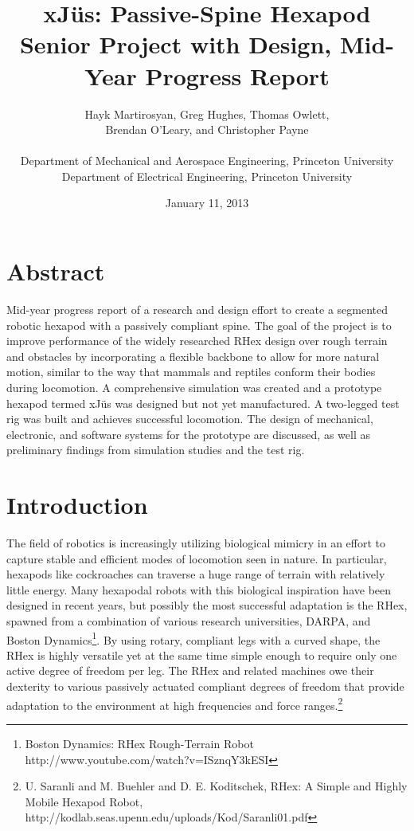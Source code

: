 \documentclass[11pt]{article}
\title{xJ\"{u}s: Passive-Spine Hexapod \\
Senior Project with Design, Mid-Year Progress Report}
\author{Hayk Martirosyan, Greg Hughes, Thomas Owlett,\\ Brendan O'Leary, and Christopher Payne\\\\
Department of Mechanical and Aerospace Engineering, Princeton University\\
Department of Electrical Engineering, Princeton University
}
\date{January 11, 2013}
\begin{document}
\maketitle

\setcounter{section}{-1}
\section{Abstract}

Mid-year progress report of a research and design effort to create a segmented robotic hexapod with a passively compliant spine. The goal of the project is to improve performance of the widely researched RHex design over rough terrain and obstacles by incorporating a flexible backbone to allow for more natural motion, similar to the way that mammals and reptiles conform their bodies during locomotion. A comprehensive simulation was created and a prototype hexapod termed xJ\"{u}s was designed but not yet manufactured. A two-legged test rig was built and achieves successful locomotion. The design of mechanical, electronic, and software systems for the prototype are discussed, as well as preliminary findings from simulation studies and the test rig.


\section{Introduction}

The field of robotics is increasingly utilizing biological mimicry in an effort to capture stable and efficient modes of locomotion seen in nature. In particular, hexapods like cockroaches can traverse a huge range of terrain with relatively little energy. Many hexapodal robots with this biological inspiration have been designed in recent years, but possibly the most successful adaptation is the RHex, spawned from a combination of various research universities, DARPA, and Boston Dynamics\footnote{Boston Dynamics: RHex Rough-Terrain Robot http://www.youtube.com/watch?v=ISznqY3kESI}. By using rotary, compliant legs with a curved shape, the RHex is highly versatile yet at the same time simple enough to require only one active degree of freedom per leg. The RHex and related machines owe their dexterity to various passively actuated compliant degrees of freedom that provide adaptation to the environment at high frequencies and force ranges.\footnote{U. Saranli and M. Buehler and D. E. Koditschek, RHex: A Simple and Highly Mobile Hexapod Robot, http://kodlab.seas.upenn.edu/uploads/Kod/Saranli01.pdf}
\end{document}
